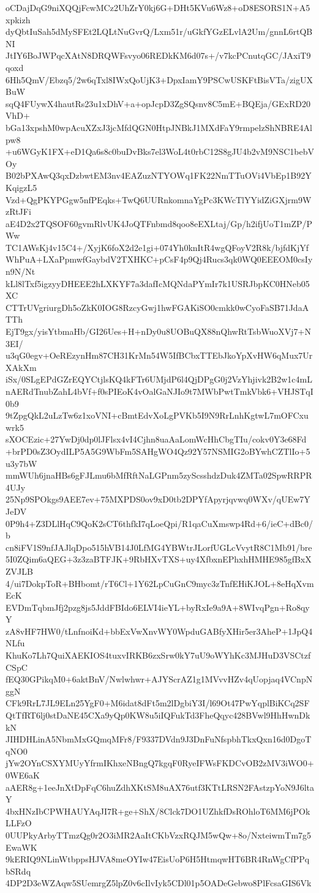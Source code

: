 oCDajDqG9niXQQjFcwMCz2UhZrY0kj6G+DHt5KVu6Wz8+oD8ESORS1N+A5xpkizh
dyQbtIuSah5dMySFEt2LQLtNuGvrQ/Lxm51r/uGkfYGzELvlA2Um/gnnL6rtQBNI
JtIY6BoJWPqcXAtN8DRQWFsvyo06REDkKM6d07s+/v7kcPCnutqGC/JAxiT9qoxd
6Hh5QmV/Ebzq5/2w6qTxl8IWxQoUjK3+DpxIamY9PSCwUSKFtBisVTa/zigUXBuW
sqQ4FUywX4hautRs23u1xDhV+a+opJcpD3ZgSQsnv8C5mE+BQEja/GExRD20VhD+
bGa13xpshM0wpAcuXZxJ3jcMfdQGN0HtpJNBkJ1MXdFaY9rmpelzShNBRE4Alpw8
+u6WGyK1FX+eD1Qa6s8c0buDvBks7el3WoL4t0rbC12S8gJU4b2vM9NSC1bebVOy
B02bPXAwQ3qxDzbwtEM3nv4EAZuzNTYOWq1FK22NmTTuOVi4VbEp1B92YKqigzL5
Vzd+QgPKYPGgw5nfPEqks+TwQ6UURnkomnaYgPc3KWcTlYYidZiGXjrm9WzRtJFi
aE4D2x2TQSOF60gvmRlvUK4JoQTFnbmd8qoo8eEXLtaj/Gp/h2ifjUoT1mZP/PWw
TC1AWsKj4v15C4+/XyjK6foX2d2e1gi+074Yh0knItR4wgQFoyV2R8k/bjfdKjYf
WhPuA+LXaPpmwfGaybdV2TXHKC+pCsF4p9Qj4Rucs3qk0WQ0EEEOM0csIyn9N/Nt
kLl8lTxf5igzyyDHEEE2hLXKYF7a3dafIcMQNdaPYmIr7k1USRJbpKC0HNeb05XC
CTTrUVgriurgDh5oZkK0IOG8RzcyGwj1hwFGAKiSO0cmkk0wCyoFaSB71JdaATTh
EjT9gx/yisYtbmaHb/GI26Ues+H+nDy0u8UOBuQX88nQhwRtTsbWuoXVj7+N3EI/
u3qG0egv+OeREzynHm87CH31KrMn54W5IfBCbxTTEbJkoYpXvHW6qMux7UrXAkXm
iSx/0SLgEPdGZrEQYCtjlsKQ4kFTr6UMjdP6l4QjDPgG0j2VzYhjivk2B2w1c4mL
nAERdTnubZahL4bVf+f0sPIEoK4vOalGaNJIo9t7MWbPwtTmkVbk6+VHJSTqI0b9
9tZpgQkL2uLzTw6z1xoVNI+cBmtEdvXoLgPVKb5I9N9RrLnhKgtwL7mOFCxuwrk5
sXOCEzic+27YwDj0dp0lJFlsx4vI4Cjhn8uaAaLomWcHhCbgTIu/cokv0Y3e68Fd
+brPD0sZ3OydILP5A5G9WbFm5SAHgWO4Qz92Y57NSMIG2oBYwhCZTlIo+5u3y7bW
mmWUh6jnaHBs6gFJLmu6bMfRftNaLGPnm5zyScsshdzDuk4ZMTa02SpwRRPR4UJy
25Np9SPOkgs9AEE7ev+75MXPDS0ov9xD0tb2DPYfApyrjqvwq0WXv/qUEw7YJeDV
0P9h4+Z3DLlHqC9QoK2sCT6thfkI7qLoeQpi/R1qaCuXmswp4Rd+6/ieC+dBc0/b
cn8iFV1S9nfJAJlqDpo515hVB14J0LfMG4YBWtrJLorfUGLcVvytR8C1Mb91/bre
5I0ZQim6aQEG+3z3zaBTFJK+9RbHXvTXS+uy4XfbxnEPhxhHMHE985gfBxXZVJLB
4/ui7DokpToR+BHbomt/rT6Cl+1Y62LpCuGnC9myc3zTnfEHiKJOL+8eHqXvmEcK
EVDmTqbmJfj2pzg8js5JddFBIdo6ELVI4ieYL+byRxIe9a9A+8WIvqPgn+Ro8qyY
zA8vHF7HW0/tLnfnoiKd+bbExVwXnvWY0WpduGABfyXHir5er3AheP+1JpQ4NLfu
KhuKo7Lh7QuiXAEKIOS4tuxvIRKB6zxSrw0kY7uU9oWYhKc3MJHuD3VSCtzfCSpC
fEQ30GPikqM0+6aktBnV/Nwlwhwr+AJYScrAZ1g1MVvvHZv4qUopjaq4VCnpNggN
CFk9RrL7JL9ELn25YgF0+M6idat8dFt5m2lDgbiY3I/l69Ot47PwYqplBiKCq2SF
QtTfRT6lj0stDaNE45CXa9yQp0KW8u5iIQFukTd3FheQqyc428BVwl9HhHwnDkkN
JIHDHLinA5NbmMxGQmqMFr8/F9337DVdn9J3DnFuNfspbhTkxQxn16d0DgoTqNO0
jYw2OYnCSXYMUyYfrmIKhxeNBngQ7kgqF0RyeIFWsFKDCvOB2zMV3iWO0+0WE6aK
aAER8g+1eeJnXtDpFqC6huZdhXKtSM8uAX76utf3KTtLRSN2FAstzpYoN9J6ltaY
4bxHNzIbCPWHAUYAqJI7R+ge+ShX/8Clck7DO1UZhkfDsROhloT6MM6jPOkLLFzO
0UUPkyArbyTTmzQg0r2O3iMR2AaItCKbVzxRQJM5wQw+8o/NxteiwmTm7g5EwaWK
9kERIQ9NLinWtbppsHJVA8meOYIw47EisUoP6H5HtmqwHT6BR4RnWgCfPPqbSRdq
4DP2D3eWZAqw5SUemrgZ5lpZ0v6cIlvIyk5CDl01p5OADeGebwo8PlFcsaGIS6Vk

